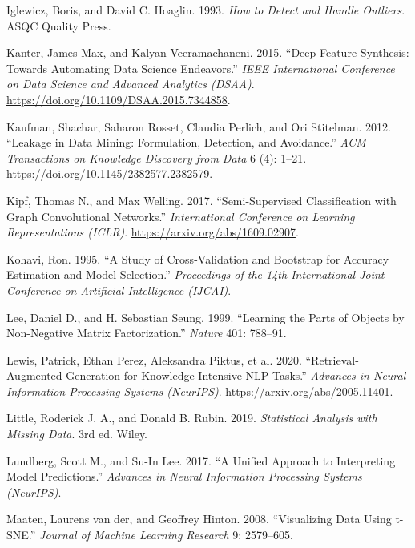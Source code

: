 \begin{CSLReferences}{1}{1}
Iglewicz, Boris, and David C. Hoaglin. 1993. \emph{How to Detect and Handle Outliers}. ASQC Quality Press.

Kanter, James Max, and Kalyan Veeramachaneni. 2015. {``Deep Feature Synthesis: Towards Automating Data Science Endeavors.''} \emph{IEEE International Conference on Data Science and Advanced Analytics (DSAA)}. \url{https://doi.org/10.1109/DSAA.2015.7344858}.

Kaufman, Shachar, Saharon Rosset, Claudia Perlich, and Ori Stitelman. 2012. {``Leakage in Data Mining: Formulation, Detection, and Avoidance.''} \emph{ACM Transactions on Knowledge Discovery from Data} 6 (4): 1--21. \url{https://doi.org/10.1145/2382577.2382579}.

Kipf, Thomas N., and Max Welling. 2017. {``Semi-Supervised Classification with Graph Convolutional Networks.''} \emph{International Conference on Learning Representations (ICLR)}. \url{https://arxiv.org/abs/1609.02907}.

Kohavi, Ron. 1995. {``A Study of Cross-Validation and Bootstrap for Accuracy Estimation and Model Selection.''} \emph{Proceedings of the 14th International Joint Conference on Artificial Intelligence (IJCAI)}.

Lee, Daniel D., and H. Sebastian Seung. 1999. {``Learning the Parts of Objects by Non-Negative Matrix Factorization.''} \emph{Nature} 401: 788--91.

Lewis, Patrick, Ethan Perez, Aleksandra Piktus, et al. 2020. {``Retrieval-Augmented Generation for Knowledge-Intensive {NLP} Tasks.''} \emph{Advances in Neural Information Processing Systems (NeurIPS)}. \url{https://arxiv.org/abs/2005.11401}.

Little, Roderick J. A., and Donald B. Rubin. 2019. \emph{Statistical Analysis with Missing Data}. 3rd ed. Wiley.

Lundberg, Scott M., and Su-In Lee. 2017. {``A Unified Approach to Interpreting Model Predictions.''} \emph{Advances in Neural Information Processing Systems (NeurIPS)}.

Maaten, Laurens van der, and Geoffrey Hinton. 2008. {``Visualizing Data Using t-{SNE}.''} \emph{Journal of Machine Learning Research} 9: 2579--605.


\end{CSLReferences}
